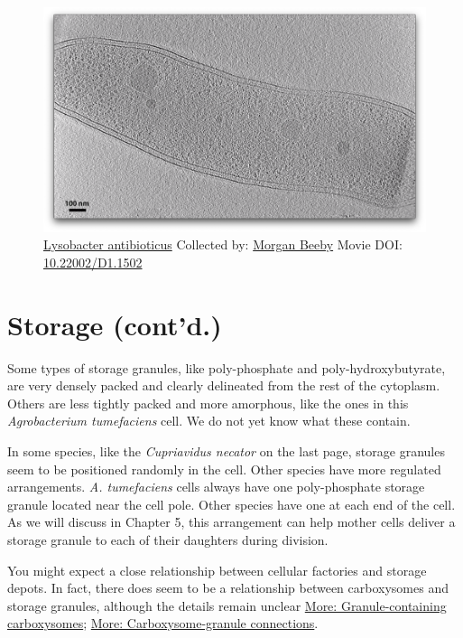\documentclass[]{tufte-book}
\begin{document}
\begin{figure}
\includegraphics{movie_stills/4_8a} \caption[\protect\hyperlink{tree}{Lysobacter antibioticus} Collected
by: \protect\hyperlink{morgan_beeby}{Morgan Beeby} Movie DOI:
\href{https://doi.org/10.22002/D1.1502}{10.22002/D1.1502}]{\protect\hyperlink{tree}{Lysobacter antibioticus} Collected
by: \protect\hyperlink{morgan_beeby}{Morgan Beeby} Movie DOI:
\href{https://doi.org/10.22002/D1.1502}{10.22002/D1.1502}}\label{fig:4-8a}
\end{figure}

\section{Storage (cont'd.)}\label{storage-contd.}

Some types of storage granules, like poly-phosphate and
poly-hydroxybutyrate, are very densely packed and clearly delineated
from the rest of the cytoplasm. Others are less tightly packed and more
amorphous, like the ones in this \emph{Agrobacterium tumefaciens} cell.
We do not yet know what these contain.

In some species, like the \emph{Cupriavidus necator} on the last page,
storage granules seem to be positioned randomly in the cell. Other
species have more regulated arrangements. \emph{A. tumefaciens} cells
always have one poly-phosphate storage granule located near the cell
pole. Other species have one at each end of the cell. As we will discuss
in Chapter 5, this arrangement can help mother cells deliver a storage
granule to each of their daughters during division.

You might expect a close relationship between cellular factories and
storage depots. In fact, there does seem to be a relationship between
carboxysomes and storage granules, although the details remain unclear
\protect\hyperlink{Granule-containing_carboxysomes}{More:
Granule-containing carboxysomes};
\protect\hyperlink{Carboxysome-granule_connections}{More:
Carboxysome-granule connections}.
\end{document}

